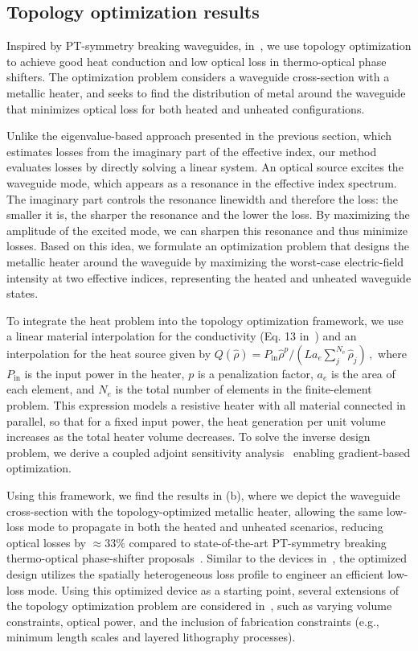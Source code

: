 \subsection*{Topology optimization results~\cite{ownpub0}}

Inspired by PT-symmetry breaking waveguides, in~\cite{ownpub0}, we use topology optimization to achieve good heat conduction and low optical loss in thermo-optical phase shifters.
The optimization problem considers a waveguide cross-section with a metallic heater, and seeks to find the distribution of metal around the waveguide that minimizes optical loss for both heated and 
unheated configurations. 

Unlike the eigenvalue-based approach presented in the previous section, which estimates losses from the imaginary part of the effective index,
 our method evaluates losses by directly solving a linear system. An optical source excites the waveguide mode, which appears
  as a resonance in the effective index spectrum. The imaginary part controls the resonance linewidth and therefore the loss:
   the smaller it is, the sharper the resonance and the lower the loss. By maximizing the amplitude of the excited mode,
    we can sharpen this resonance and thus minimize losses. Based on this idea, we formulate an optimization problem that designs
     the metallic heater around the waveguide by maximizing the worst-case electric-field intensity at two effective indices, representing
      the heated and unheated waveguide states.
 
 To integrate the heat problem into the 
 topology optimization framework, we use a linear material interpolation 
for the conductivity (Eq. 13 in~\cite{ownpub0}) and an interpolation for the heat source given by $
 Q(\hat{\rho})=P_{\text{in}} \hat{\rho}^p / \left( L a_e \sum^{N_\text{e}}_j \hat{\rho}_j \right)\,,
$
where $P_\text{in}$ is the input power in the heater, $p$ is a penalization factor, $a_e$ is the area of each element, and 
$N_e$ is the total number of elements in the finite-element problem. 
This expression models a resistive heater with all material connected in parallel, so that for a fixed input power, the heat 
generation per unit volume increases as the total heater volume decreases.
To solve the inverse design
problem, we derive a coupled adjoint sensitivity analysis~\cite{ownpub0} enabling gradient-based optimization.

Using this framework, we find the results in  (b), where we depict the waveguide cross-section with the topology-optimized metallic heater,
allowing the same low-loss mode to propagate in both the heated and unheated scenarios,
reducing optical losses by $\approx 33 \%$ compared to state-of-the-art PT-symmetry breaking thermo-optical phase-shifter proposals~\cite{lipson}. Similar to the devices
in~\cite{lipson}, the optimized design utilizes the spatially heterogeneous loss profile to engineer an efficient low-loss mode. Using this optimized device as a starting point, several extensions of the topology optimization problem are considered in~\cite{ownpub0}, such as varying volume constraints, optical power, and the inclusion of fabrication constraints (e.g., minimum length scales and layered 
lithography processes).

